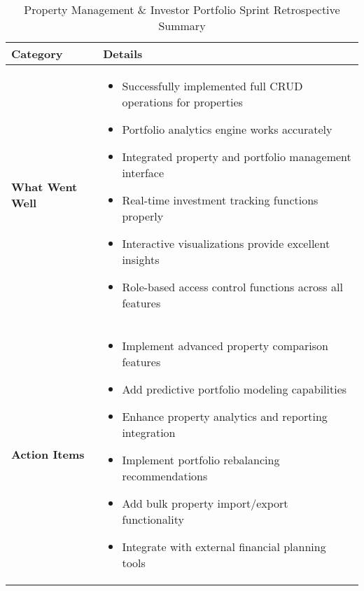 \begin{table}[htbp]
    \centering
    \begin{tabular}{|p{3cm}|p{10cm}|}
        \hline
        \textbf{Category} & \textbf{Details} \\
        \hline
        \textbf{What Went Well} & 
        \begin{itemize}
            \item Successfully implemented full CRUD operations for properties
            \item Portfolio analytics engine works accurately
            \item Integrated property and portfolio management interface
            \item Real-time investment tracking functions properly
            \item Interactive visualizations provide excellent insights
            \item Role-based access control functions across all features
        \end{itemize} \\
        \hline
        \textbf{Action Items} & 
        \begin{itemize}
            \item Implement advanced property comparison features
            \item Add predictive portfolio modeling capabilities
            \item Enhance property analytics and reporting integration
            \item Implement portfolio rebalancing recommendations
            \item Add bulk property import/export functionality
            \item Integrate with external financial planning tools
        \end{itemize} \\
        \hline
    \end{tabular}
    \caption{Property Management \& Investor Portfolio Sprint Retrospective Summary}
    \label{tab:property-portfolio-retrospective}
\end{table}

 